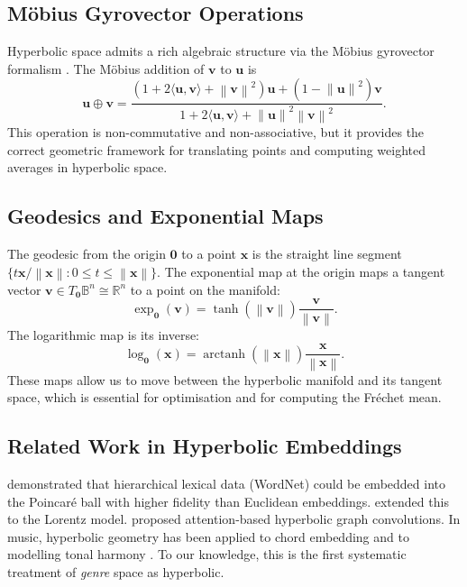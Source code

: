 \documentclass[12pt,a4paper]{article}
\newcommand{\R}{\mathbb{R}}
\newcommand{\ball}{\mathbb{B}}
\newcommand{\norm}[1]{\left\| #1 \right\|}
\newcommand{\ip}[2]{\langle #1, #2 \rangle}
\newcommand{\Frechet}{Fr\'echet}
\begin{document}
\subsection{M\"obius Gyrovector Operations}

Hyperbolic space admits a rich algebraic structure via the M\"obius gyrovector formalism \citep{ungar2008gyrovector}. The M\"obius addition of $\mathbf{v}$ to $\mathbf{u}$ is
\begin{equation}
  \mathbf{u} \oplus \mathbf{v} = \frac{\left(1 + 2\ip{\mathbf{u}}{\mathbf{v}} + \norm{\mathbf{v}}^2\right)\mathbf{u} + \left(1 - \norm{\mathbf{u}}^2\right)\mathbf{v}}{1 + 2\ip{\mathbf{u}}{\mathbf{v}} + \norm{\mathbf{u}}^2\norm{\mathbf{v}}^2}.
  \label{eq:mobius-add}
\end{equation}
This operation is non-commutative and non-associative, but it provides the correct geometric framework for translating points and computing weighted averages in hyperbolic space.

\subsection{Geodesics and Exponential Maps}

The geodesic from the origin $\mathbf{0}$ to a point $\mathbf{x}$ is the straight line segment $\{ t\mathbf{x}/\norm{\mathbf{x}} : 0 \le t \le \norm{\mathbf{x}} \}$. The exponential map at the origin maps a tangent vector $\mathbf{v} \in T_{\mathbf{0}}\ball^n \cong \R^n$ to a point on the manifold:
\begin{equation}
  \exp_{\mathbf{0}}(\mathbf{v}) = \tanh(\norm{\mathbf{v}}) \frac{\mathbf{v}}{\norm{\mathbf{v}}}.
  \label{eq:exp-map}
\end{equation}
The logarithmic map is its inverse:
\begin{equation}
  \log_{\mathbf{0}}(\mathbf{x}) = \operatorname{arctanh}(\norm{\mathbf{x}}) \frac{\mathbf{x}}{\norm{\mathbf{x}}}.
  \label{eq:log-map}
\end{equation}
These maps allow us to move between the hyperbolic manifold and its tangent space, which is essential for optimisation and for computing the \Frechet{} mean.

\subsection{Related Work in Hyperbolic Embeddings}

\citet{nickel2017poincare} demonstrated that hierarchical lexical data (WordNet) could be embedded into the Poincar\'e ball with higher fidelity than Euclidean embeddings. \citet{nickel2018learning} extended this to the Lorentz model. \citet{chami2019hyperbolic} proposed attention-based hyperbolic graph convolutions. In music, hyperbolic geometry has been applied to chord embedding \citep{cherla2018hyperbolic} and to modelling tonal harmony \citep{honing2019structure}. To our knowledge, this is the first systematic treatment of \emph{genre} space as hyperbolic.
\end{document}
